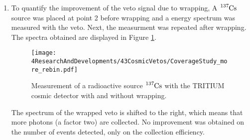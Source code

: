 \begin{enumerate}

\item{} To quantify the improvement of the veto signal due to wrapping,  A $\ce{^{137}Cs}$ source was placed at point 2 before wrapping and a energy spectrum was measured with the veto. Next, the measurment was repeated after wrapping. The spectra obtained are displayed in Figure \ref{fig:VetoCoverageImprovement}.

\begin{figure}[h]
\centering
\texttt{[image: 4ResearchAndDevelopments/43CosmicVetos/CoverageStudy\_more\_rebin.pdf]}
\caption{Measurement of a radioactive source $\ce{^{137}Cs}$ with the TRITIUM cosmic detector with and without wrapping.\label{fig:VetoCoverageImprovement}}
\end{figure}

The spectrum of the wrapped veto is shifted to the right, which means that more photons (a factor two) are collected. No improvement was obtained on the number of events detected, only on the collection efficiency.



\end{enumerate}
